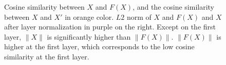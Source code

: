 \begin{figure}[t]
{    }
  \caption{ Cosine similarity between $X$ and $F(X)$, and the cosine similarity between $X$ and $X'$ in orange color. $L2$ norm of $X$ and $F(X)$ and $X$ after layer normalization in purple on the right. Except on the first layer, $\|X\|$ is significantly higher than $\|F(X)\|$. $\|F(X)\|$ is higher at the first layer, which corresponds to the low cosine similarity at the first layer.}
  \label{appendix:residual} 
\end{figure}

